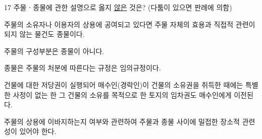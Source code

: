 \begin{question}{17}
주물ㆍ종물에 관한 설명으로 옳지 \uline{않은} 것은? (다툼이 있으면 판례에 의함)
\begin{choices}
  \item 주물의 소유자나 이용자의 상용에 공여되고 있다면 주물 자체의 효용과 직접적 관련이 되지 않는 물건도 종물이다.
  \item 주물의 구성부분은 종물이 아니다.
  \item 종물은 주물의 처분에 따른다는 규정은 임의규정이다.
  \item 건물에 대한 저당권이 실행되어 매수인(경락인)이 건물의 소유권을 취득한 때에는 특별한 사정이 없는 한 그 건물의 소유를 목적으로 한 토지의 임차권도 매수인에게 이전된다.
  \item 주물의 상용에 이바지하는지 여부와 관련하여 주물과 종물 사이에 밀접한 장소적 관련성이 있어야 한다.
\end{choices}
\end{question}
